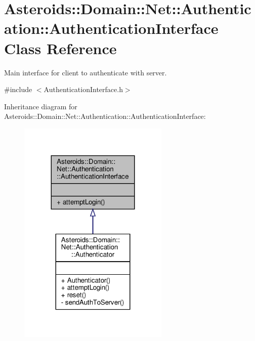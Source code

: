 \hypertarget{classAsteroids_1_1Domain_1_1Net_1_1Authentication_1_1AuthenticationInterface}{}\section{Asteroids\+:\+:Domain\+:\+:Net\+:\+:Authentication\+:\+:Authentication\+Interface Class Reference}
\label{classAsteroids_1_1Domain_1_1Net_1_1Authentication_1_1AuthenticationInterface}


Main interface for client to authenticate with server.  




{\ttfamily \#include $<$Authentication\+Interface.\+h$>$}



Inheritance diagram for Asteroids\+:\+:Domain\+:\+:Net\+:\+:Authentication\+:\+:Authentication\+Interface\+:\nopagebreak
\begin{figure}[H]
\begin{center}
\leavevmode
\includegraphics[width=203pt]{classAsteroids_1_1Domain_1_1Net_1_1Authentication_1_1AuthenticationInterface__inherit__graph}
\end{center}
\end{figure}


